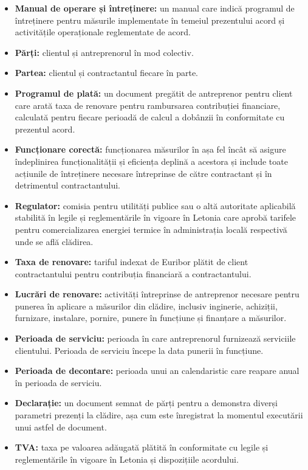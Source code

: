 \begin{multicols}{2}
\begin{itemize}[label={}]
\item\textbf{Manual de operare și întreținere:} un manual care indică programul de întreținere pentru măsurile implementate în temeiul prezentului acord și activitățile operaționale reglementate de acord.
\item\textbf{Părți:} clientul și antreprenorul în mod colectiv.
\item\textbf{Partea:} clientul și contractantul fiecare în parte.
\item\textbf{Programul de plată:} un document pregătit de antreprenor pentru client care arată taxa de renovare pentru rambursarea contribuției financiare, calculată pentru fiecare perioadă de calcul a dobânzii în conformitate cu prezentul acord.
\item\textbf{Funcționare corectă:} funcționarea măsurilor în așa fel încât să asigure îndeplinirea funcționalității și eficiența deplină a acestora și include toate acțiunile de întreținere necesare întreprinse de către contractant și în detrimentul contractantului.
\item\textbf{Regulator:} comisia pentru utilități publice sau o altă autoritate aplicabilă stabilită în legile și reglementările în vigoare în Letonia care aprobă tarifele pentru comercializarea energiei termice în administrația locală respectivă unde se află clădirea.
\item\textbf{Taxa de renovare:} tariful indexat de Euribor plătit de client contractantului pentru contribuția financiară a contractantului.
\item\textbf{Lucrări de renovare:} activități întreprinse de antreprenor necesare pentru punerea în aplicare a măsurilor din clădire, inclusiv inginerie, achiziții, furnizare, instalare, pornire, punere în funcțiune și finanțare a măsurilor.
\item\textbf{Perioada de serviciu:} perioada în care antreprenorul furnizează serviciile clientului. Perioada de serviciu începe la data punerii în funcțiune.
\item\textbf{Perioada de decontare:} perioada unui an calendaristic care reapare anual în perioada de serviciu.
\item\textbf{Declarație:} un document semnat de părți pentru a demonstra diverși parametri prezenți la clădire, așa cum este înregistrat la momentul executării unui astfel de document.
\item\textbf{TVA:} taxa pe valoarea adăugată plătită în conformitate cu legile și reglementările în vigoare în Letonia și dispozițiile acordului.
\end{itemize}



\end{multicols}
